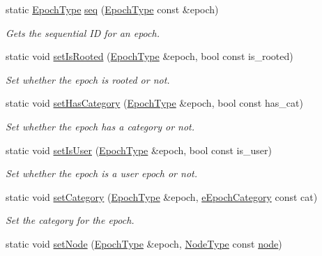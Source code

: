 \begin{DoxyCompactItemize}
static \hyperlink{namespacevt_a985a5adf291c34a3ca263b3378388236}{Epoch\+Type} \hyperlink{structvt_1_1epoch_1_1_epoch_manip_ac34685702f19dde2f5bc25fcb43ec038}{seq} (\hyperlink{namespacevt_a985a5adf291c34a3ca263b3378388236}{Epoch\+Type} const \&epoch)
\begin{DoxyCompactList}\small\item\em Gets the sequential ID for an epoch. \end{DoxyCompactList}\item 
static void \hyperlink{structvt_1_1epoch_1_1_epoch_manip_aae48ba1aafb105551df363ffcb578881}{set\+Is\+Rooted} (\hyperlink{namespacevt_a985a5adf291c34a3ca263b3378388236}{Epoch\+Type} \&epoch, bool const is\+\_\+rooted)
\begin{DoxyCompactList}\small\item\em Set whether the {\ttfamily epoch} is rooted or not. \end{DoxyCompactList}\item 
static void \hyperlink{structvt_1_1epoch_1_1_epoch_manip_a39400bd927257031ae4b074be0739a36}{set\+Has\+Category} (\hyperlink{namespacevt_a985a5adf291c34a3ca263b3378388236}{Epoch\+Type} \&epoch, bool const has\+\_\+cat)
\begin{DoxyCompactList}\small\item\em Set whether the {\ttfamily epoch} has a category or not. \end{DoxyCompactList}\item 
static void \hyperlink{structvt_1_1epoch_1_1_epoch_manip_a4ecda0e3e96089747beea148ca0b8257}{set\+Is\+User} (\hyperlink{namespacevt_a985a5adf291c34a3ca263b3378388236}{Epoch\+Type} \&epoch, bool const is\+\_\+user)
\begin{DoxyCompactList}\small\item\em Set whether the {\ttfamily epoch} is a user epoch or not. \end{DoxyCompactList}\item 
static void \hyperlink{structvt_1_1epoch_1_1_epoch_manip_a5ef6f747225cf046cff1fb39945fa547}{set\+Category} (\hyperlink{namespacevt_a985a5adf291c34a3ca263b3378388236}{Epoch\+Type} \&epoch, \hyperlink{namespacevt_1_1epoch_a956abe0aceef0d10a988de8acb002c7c}{e\+Epoch\+Category} const cat)
\begin{DoxyCompactList}\small\item\em Set the category for the {\ttfamily epoch}. \end{DoxyCompactList}\item 
static void \hyperlink{structvt_1_1epoch_1_1_epoch_manip_a5c4c075234fc7c263b0eabf09e85ef05}{set\+Node} (\hyperlink{namespacevt_a985a5adf291c34a3ca263b3378388236}{Epoch\+Type} \&epoch, \hyperlink{namespacevt_a866da9d0efc19c0a1ce79e9e492f47e2}{Node\+Type} const \hyperlink{structvt_1_1epoch_1_1_epoch_manip_a7120f73ef583ab8f061334fc0bc519c3}{node})

\end{DoxyCompactItemize}
